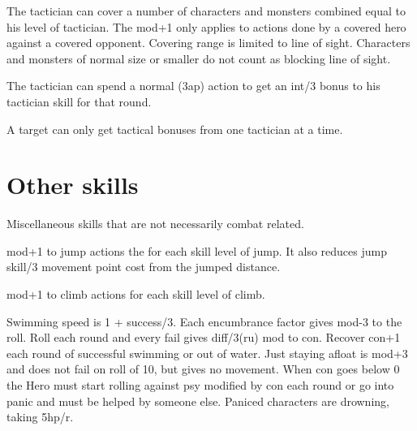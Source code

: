 The tactician can cover a number of characters and monsters combined equal to his level of tactician. The mod+1 only applies to actions done by a covered hero against a covered opponent. Covering range is limited to line of sight. Characters and monsters of normal size or smaller do not count as blocking line of sight.

The tactician can spend a normal (3ap) action to get an int/3 bonus to his tactician skill for that round.

A target can only get tactical bonuses from one tactician at a time.




\closeskillslist
















\section*{Other skills}

Miscellaneous skills that are not necessarily combat related.



\openskillslist



 mod+1 to jump actions the for each skill level of jump. It also reduces jump skill/3 movement point cost from the jumped distance.


 mod+1 to climb actions for each skill level of climb.


Swimming speed is 1 + success/3. Each encumbrance factor gives mod-3 to the roll. Roll each round and every fail gives diff/3(ru) mod to con. Recover con+1 each round of successful swimming or out of water. Just staying afloat is mod+3 and does not fail on roll of 10, but gives no movement. When con goes below 0 the Hero must start rolling against psy modified by con each round or go into panic and must be helped by someone else. Paniced characters are drowning, taking 5hp/r.



